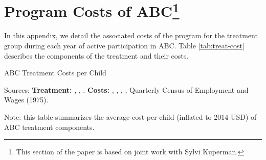 \section[Program Costs of ABC]{Program Costs of ABC\footnote{This section of the paper is based on joint work with Sylvi Kuperman.}} \label{app:programcosts}

\noindent In this appendix, we detail the associated costs of the program for the treatment group during each year of active participation in ABC. Table \ref{tab:treat-cost}  describes the components of the treatment and their costs. \\


\begin{table}[H]
\caption{ABC Treatment Costs per Child} \label{tab:treat-cost}
\centering
\begin{adjustbox}{max width=\textwidth}
\begin{threeparttable}
\scriptsize

\begin{tablenotes}
\scriptsize
\item Sources: \textbf{Treatment:} \cite{Ramey_Collier_etal_1976_CarolinaAbecedarianProject}, \cite{Ramey_McGinness_etal_1982_Abecedarianapproach}, \cite{Clarke_Campbell_1998_ABC_Comparison_ECRQ}. \textbf{Costs:} \cite{Barnett_Masse_2002_benefitcost},  \cite{FPGC_Progress-Report_1973}, \cite{Cutler_Meara_1998_Med-Costs_BOOK}, \cite{Helburn_1995_Childcare-Report}, Quarterly Census of Employment and Wages (1975).

\item Note: this table summarizes the average cost per child (inflated to 2014 USD) of ABC treatment components.
\end{tablenotes}
\end{threeparttable}
\end{adjustbox}
\end{table}

